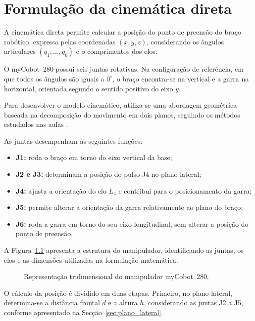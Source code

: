 
\chapter{Formulação da cinemática direta}
\label{ch:dir_kin}

A cinemática direta permite calcular a posição do ponto de preensão do braço robótico, expressa pelas coordenadas $(x,y,z)$, considerando os ângulos articulares $(q_1,\ldots,q_6)$ e o comprimentos dos elos.

O myCobot~280 possui seis juntas rotativas. Na configuração de referência, em que todos os ângulos são iguais a $0^\circ$, o braço encontra-se na vertical e a garra na horizontal, orientada segundo o sentido positivo do eixo $y$.

Para desenvolver o modelo cinemático, utiliza-se uma abordagem geométrica baseada na decomposição do movimento em dois planos, seguindo os métodos estudados nas aulas \cite{bicho_2dof,bicho_3dof}.

As juntas desempenham as seguintes funções:

\begin{itemize}
    \item \textbf{J1:} roda o braço em torno do eixo vertical da base;

    \item \textbf{J2 e J3:} determinam a posição do pulso J4 no plano lateral;

    \item \textbf{J4:} ajusta a orientação do elo $L_4$ e contribui para o posicionamento da garra;

    \item \textbf{J5:} permite alterar a orientação da garra relativamente ao plano do braço;

    \item \textbf{J6:} roda a garra em torno do seu eixo longitudinal, sem alterar a posição do ponto de preensão.
\end{itemize}

A Figura~\ref{fig:3d} apresenta a estrutura do manipulador, identificando as juntas, os elos e as dimensões utilizadas na formulação matemática.

\begin{figure}[H]
    \centering
    \resizebox{0.5\textwidth}{!}{
        
    }
    \caption{Representação tridimensional do manipulador myCobot~280.}
    \label{fig:3d}
\end{figure}

O cálculo da posição é dividido em duas etapas. Primeiro, no plano lateral, determina-se a distância frontal $d$ e a altura $h$, considerando as juntas J2 a J5, conforme apresentado na Secção~\ref{sec:plano_lateral}.


